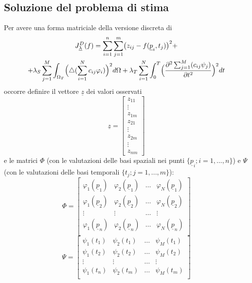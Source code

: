 \documentclass[a4paper,11pt,twoside,openright]{book}							%
\begin{document}
\subsection*{Soluzione del problema di stima}
Per avere una forma matriciale della versione discreta di 
\begin{multline*}
J_{\underline \lambda }^D(f)= \sum_{i=1}^n \sum_{j=1}^m \bigl( z_{ij} - f(\underline p_i,t_j) \bigr)^2 + \\
+ \lambda_S  \sum_{j=1}^M \int_{\Omega_T} \Bigl( \triangle(\sum_{i=1}^N  c_{ij}\varphi_i ) \Bigr)^2 d \Omega + \lambda_T \sum_{i=1}^N\int_0^T \Bigl( \frac{\partial^2 \sum_{j=1}^M(c_{ij}\psi_j) }{\partial t ^2} \Bigr)^2 dt
\end{multline*}
 occorre definire il vettore $\underline z$ dei valori osservati 
\begin{equation}
\underline z =
\begin{bmatrix}
z_{11}  \\
\vdots\\
z_{1m}  \\
z_{21}  \\
\vdots\\
z_{2m}  \\
\vdots\\
z_{nm}
\end{bmatrix}
\end{equation}
e le matrici $\Phi$ (con le valutazioni delle basi spaziali nei punti $\{\underline p_i; i = 1,...,n\}$) e $\Psi$ (con le valutazioni delle basi temporali $\{t_j; j = 1,...,m\}$):
$$
\Phi =
\begin{bmatrix}
\varphi_{1}(\underline p_1) & \varphi_{2}(\underline p_1) & \hdots & \varphi_{N}(\underline p_1)  \\
\varphi_{1}(\underline p_2) & \varphi_{2}(\underline p_2) & \hdots & \varphi_{N}(\underline p_2)  \\
\vdots & \vdots & \hdots & \vdots \\
\varphi_{1}(\underline p_n) & \varphi_{2}(\underline p_n) & \hdots & \varphi_{N}(\underline p_n)  \\
\end{bmatrix}
$$
$$
\Psi = 
\begin{bmatrix}
\psi_{1}( t_1) & \psi_{2}( t_1) & \hdots & \psi_{M}( t_1)  \\
\psi_{1}( t_2) & \psi_{2}( t_2) & \hdots & \psi_{M}( t_2)  \\
\vdots & \vdots & \hdots & \vdots \\
\psi_{1}( t_n) & \psi_{2}( t_m) & \hdots & \psi_{M}( t_m)  \\
\end{bmatrix}
$$
\end{document}

